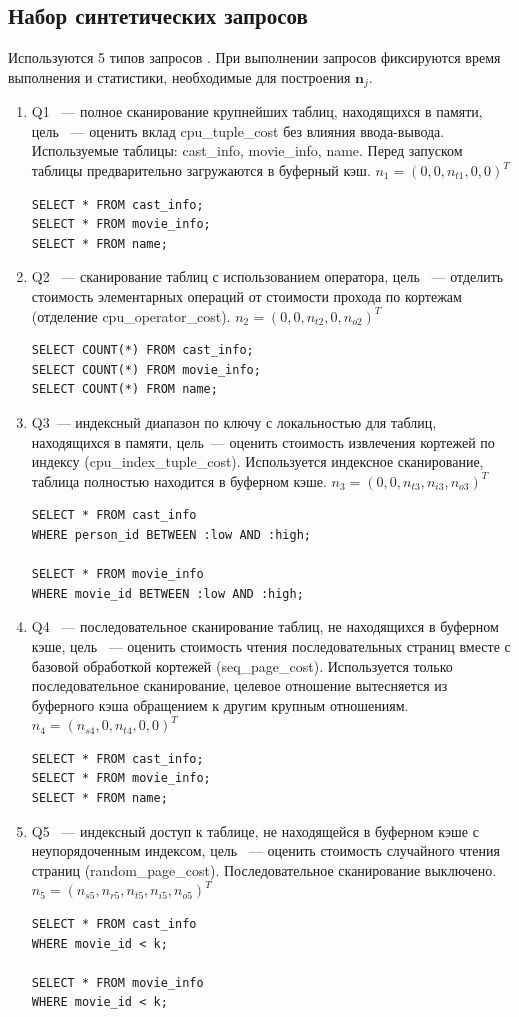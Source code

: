 \subsection{Набор синтетических запросов}
Используются 5 типов запросов \cite{10.1109/ICDE.2013.6544899}. При выполнении запросов фиксируются время выполнения и статистики, необходимые для построения \(\mathbf{n}_j\).
\begin{enumerate}
  \item Q1 ~--- полное сканирование крупнейших таблиц, находящихся в памяти, цель ~--- оценить вклад cpu\_tuple\_cost без влияния ввода-вывода. Используемые таблицы: cast\_info, movie\_info, name. Перед запуском таблицы предварительно загружаются в буферный кэш. \(n_1 = (0,0,n_{t1}, 0, 0)^{T}\)
\begin{verbatim}
SELECT * FROM cast_info;
SELECT * FROM movie_info;
SELECT * FROM name;
\end{verbatim}

  \item Q2 ~--- сканирование таблиц с использованием оператора, цель ~--- отделить стоимость элементарных операций от стоимости прохода по кортежам (отделение cpu\_operator\_cost). \(n_2 = (0,0,n_{t2}, 0, n_{o2})^{T}\)
\begin{verbatim}
SELECT COUNT(*) FROM cast_info;
SELECT COUNT(*) FROM movie_info;
SELECT COUNT(*) FROM name;
\end{verbatim}

  \item Q3~--- индексный диапазон по ключу с локальностью для таблиц, находящихся в памяти, цель~--- оценить стоимость извлечения кортежей по индексу (cpu\_index\_tuple\_cost). Используется индексное сканирование, таблица полностью находится в буферном кэше. \(n_3 = (0,0,n_{t3}, n_{i3}, n_{o3})^{T}\)
\begin{verbatim}
SELECT * FROM cast_info
WHERE person_id BETWEEN :low AND :high;

SELECT * FROM movie_info
WHERE movie_id BETWEEN :low AND :high;
\end{verbatim}
  \item Q4 ~--- последовательное сканирование таблиц, не находящихся в буферном кэше, цель ~--- оценить стоимость чтения последовательных страниц вместе с базовой обработкой кортежей (seq\_page\_cost). Используется только последовательное сканирование, целевое отношение вытесняется из буферного кэша обращением к другим крупным отношениям. \(n_4 = (n_{s4},0,n_{t4}, 0, 0)^{T}\)
\begin{verbatim}
SELECT * FROM cast_info;
SELECT * FROM movie_info;
SELECT * FROM name;
\end{verbatim}
  \item Q5 ~--- индексный доступ к таблице, не находящейся в буферном кэше с неупорядоченным индексом, цель ~--- оценить стоимость случайного чтения страниц (random\_page\_cost). Последовательное сканирование выключено. \(n_5 = (n_{s5},n_{r5},n_{t5}, n_{i5}, n_{o5})^{T}\)
\begin{verbatim}
SELECT * FROM cast_info
WHERE movie_id < k;

SELECT * FROM movie_info
WHERE movie_id < k;
\end{verbatim}
\end{enumerate}


